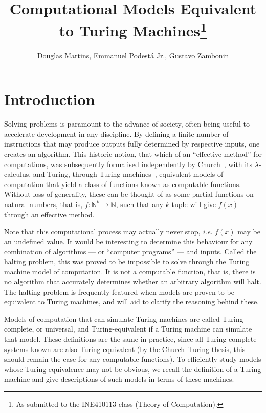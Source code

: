 \documentclass[12pt]{article}
\title{Computational Models Equivalent to Turing Machines\footnote{
    As submitted to the INE410113 class (Theory of Computation).}}
\author{Douglas Martins\inst{1}, Emmanuel Podestá Jr.\inst{1}, Gustavo Zambonin\inst{1}}
\begin{document}
 

\maketitle

\section{Introduction}\label{sec:intro}
 
Solving problems is paramount to the advance of society, often being useful to accelerate development in any discipline. By defining a finite number of instructions that may produce outputs fully determined by respective inputs, one creates an algorithm. This historic notion, that which of an ``effective method'' for computations, was subsequently formalised independently by Church~\cite{}, with its $\lambda$-calculus, and Turing, through Turing machines~\cite{}, equivalent models of computation that yield a class of functions known as computable functions. Without loss of generality, these can be thought of as some partial functions on natural numbers, that is, $f : \mathbb{N}^{k} \rightarrow \mathbb{N}$, such that any $k$-tuple will give $f(x)$ through an effective method. 

Note that this computational process may actually never stop, \emph{i.e.} $f(x)$ may be an undefined value. It would be interesting to determine this behaviour for any combination of algorithms --- or ``computer programs'' --- and inputs. Called the halting problem, this was proved to be impossible to solve through the Turing machine model of computation. It is not a computable function, that is, there is no algorithm that accurately determines whether an arbitrary algorithm will halt. The halting problem is frequently featured when models are proven to be equivalent to Turing machines, and will aid to clarify the reasoning behind these.

Models of computation that can simulate Turing machines are called Turing-complete, or universal, and Turing-equivalent if a Turing machine can simulate that model. These definitions are the same in practice, since all Turing-complete systems known are also Turing-equivalent (by the Church--Turing thesis, this should remain the case for any computable functions). To efficiently study models whose Turing-equivalence may not be obvious, we recall the definition of a Turing machine and give descriptions of such models in terms of these machines.
\end{document}
